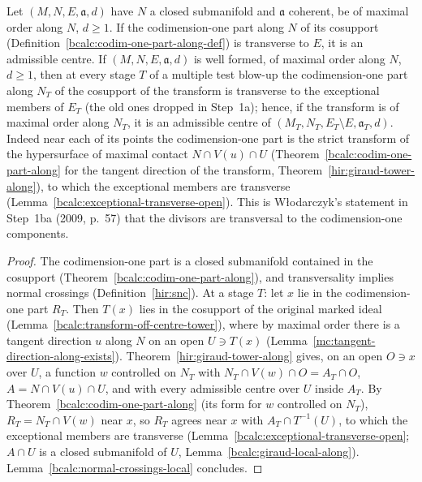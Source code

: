 \begin{corollary}
\label{bcalc:codim-one-admissible-along}
\mixedleanok
Let \((M,N,E,\mathfrak a,d)\) have \(N\) a closed submanifold and \(\mathfrak a\) coherent, be of maximal order along \(N\), \(d\ge1\). If the codimension-one part along \(N\) of its cosupport
(Definition~\ref{bcalc:codim-one-part-along-def}) is transverse to \(E\), it is an admissible centre. If \((M,N,E,\mathfrak a,d)\) is well formed, of
maximal order along \(N\), \(d\ge1\), then at every stage \(T\) of a multiple test blow-up the codimension-one part along \(N_T\) of the cosupport of the
transform is transverse to the exceptional members of \(E_T\) (the old ones dropped in Step~1a); hence, if the transform is of maximal order along \(N_T\), it is
an admissible centre of \((M_T,N_T,E_T\setminus E,\mathfrak a_T,d)\). Indeed near each of its points the codimension-one part is the strict transform of
the hypersurface of maximal contact \(N\cap V(u)\cap U\) (Theorem~\ref{bcalc:codim-one-part-along} for the tangent direction of the transform,
Theorem~\ref{hir:giraud-tower-along}), to which the exceptional members are transverse (Lemma~\ref{bcalc:exceptional-transverse-open}). This is Włodarczyk's
statement in Step~1ba (2009, p.~57) that the divisors are transversal to the codimension-one components.
\end{corollary}
\begin{proof}
\mixedleanok
The codimension-one part is a closed submanifold contained in the cosupport (Theorem~\ref{bcalc:codim-one-part-along}), and transversality implies normal
crossings (Definition~\ref{hir:snc}). At a stage \(T\): let \(x\) lie in the codimension-one part \(R_T\). Then \(T(x)\) lies in the cosupport of the
original marked ideal (Lemma~\ref{bcalc:transform-off-centre-tower}), where by maximal order there is a tangent direction \(u\) along \(N\) on an open \(U\ni T(x)\)
(Lemma~\ref{mc:tangent-direction-along-exists}). Theorem~\ref{hir:giraud-tower-along} gives, on an open \(O\ni x\) over \(U\), a function \(w\) controlled on
\(N_T\) with \(N_T\cap V(w)\cap O=A_T\cap O\), \(A=N\cap V(u)\cap U\), and with every admissible centre over \(U\) inside \(A_T\). By
Theorem~\ref{bcalc:codim-one-part-along} (its form for \(w\) controlled on \(N_T\)), \(R_T=N_T\cap V(w)\) near \(x\), so \(R_T\) agrees near \(x\) with
\(A_T\cap T^{-1}(U)\), to which the exceptional members are transverse (Lemma~\ref{bcalc:exceptional-transverse-open}; \(A\cap U\) is a closed submanifold of \(U\),
Lemma~\ref{bcalc:giraud-local-along}). Lemma~\ref{bcalc:normal-crossings-local} concludes.
\end{proof}

